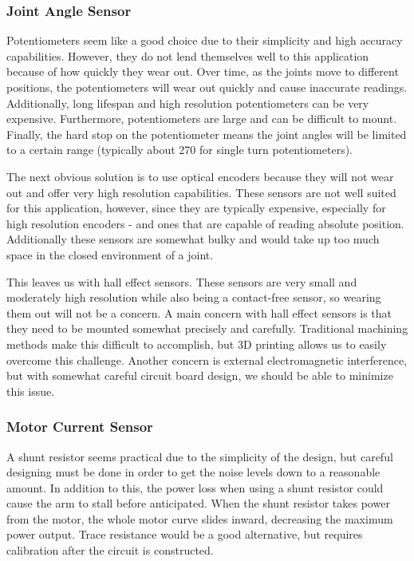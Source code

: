 \subsubsection{Joint Angle Sensor}
Potentiometers seem like a good choice due to their simplicity and high accuracy capabilities. However, they do not lend themselves well to this application because of how quickly they wear out. Over time, as the joints move to different positions, the potentiometers will wear out quickly and cause inaccurate readings. Additionally, long lifespan and high resolution potentiometers can be very expensive. Furthermore, potentiometers are large and can be difficult to mount. Finally, the hard stop on the potentiometer means the joint angles will be limited to a certain range (typically about 270 \textdegree  for single turn potentiometers).

\noindent The next obvious solution is to use optical encoders because they will not wear out and offer very high resolution capabilities. These sensors are not well suited for this application, however, since they are typically expensive, especially for high resolution encoders - and ones that are capable of reading absolute position. Additionally these sensors are somewhat bulky and would take up too much space in the closed environment of a joint. 

\noindent This leaves us with hall effect sensors. These sensors are very small and moderately high resolution while also being a contact-free sensor, so wearing them out will not be a concern. A main concern with hall effect sensors is that they need to be mounted somewhat precisely and carefully. Traditional machining methods make this difficult to accomplish, but 3D printing allows us to easily overcome this challenge.  Another concern is external electromagnetic interference, but with somewhat careful circuit board design, we should be able to minimize this issue.

\subsubsection{Motor Current Sensor}
A shunt resistor seems practical due to the simplicity of the design, but careful designing must be done in order to get the noise levels down to a reasonable amount. In addition to this, the power loss when using a shunt resistor could cause the arm to stall before anticipated. When the shunt resistor takes power from the motor, the whole motor curve slides inward, decreasing the maximum power output. Trace resistance would be a good alternative, but requires calibration after the circuit is constructed. 

